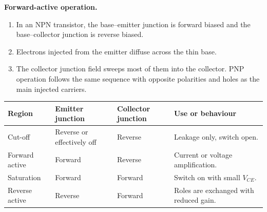 \documentclass[12pt,a4paper]{article}
\begin{document}
\textbf{Forward-active operation.}
\begin{enumerate}[leftmargin=*, itemsep=3pt, topsep=4pt]
  \item In an NPN transistor, the base--emitter junction is forward biased and the base--collector junction is reverse biased.
  \item Electrons injected from the emitter diffuse across the thin base.
  \item The collector junction field sweeps most of them into the collector. PNP operation follows the same sequence with opposite polarities and holes as the main injected carriers.
\end{enumerate}

\begin{tcolorbox}[tikzbox,title={NPN and PNP transistor symbols},unbreakable]
\centering
{}
\end{tcolorbox}

\par\vspace{6pt}\noindent
\begin{tabularx}{\linewidth}{|B{3.3cm}|Y|Y|Y|}\hline
Region & \textbf{Emitter junction} & \textbf{Collector junction} & \textbf{Use or behaviour} \\ \hline
Cut-off & Reverse or effectively off & Reverse & Leakage only, switch open. \\ \hline
Forward active & Forward & Reverse & Current or voltage amplification. \\ \hline
Saturation & Forward & Forward & Switch on with small \(V_{CE}\). \\ \hline
Reverse active & Reverse & Forward & Roles are exchanged with reduced gain. \\ \hline
\end{tabularx}
\end{document}
